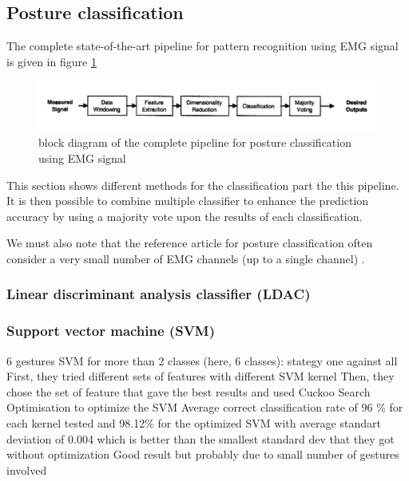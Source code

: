 \documentclass{article}
\begin{document}
\subsection{Posture classification}

The complete state-of-the-art pipeline for pattern recognition using EMG signal is given in figure \ref{fig:classificationPipeline}

\begin{figure}[H]
    \centering
    \includegraphics[width=15cm]{images/classificationPipeline.png}
    \caption{block diagram of the complete pipeline for posture classification using EMG signal \cite{ref:classification3}}
    \label{fig:classificationPipeline}
\end{figure}

This section shows different methods for the classification part the this pipeline. It is then possible to combine multiple classifier to enhance the prediction accuracy by using a majority vote upon the results of each classification.

We must also note that the reference article for posture classification often consider a very small number of EMG channels (up to a single channel) \cite{ref:classification1, ref:classification2}.


\subsubsection{Linear discriminant analysis classifier (LDAC)}


\subsubsection{Support vector machine (SVM)}
6 gestures
SVM for more than 2 classes (here, 6 classes): stategy one against all
First, they tried different sets of features with different SVM kernel
Then, they chose the set of feature that gave the best results and used Cuckoo Search Optimisation to optimize the SVM
Average correct classification rate of 96 \% for each kernel tested and 98.12\% for the optimized SVM with average standart deviation of 0.004 which is better than the smallest standard dev that they got without optimization
Good result but probably due to small number of gestures involved
\end{document}
